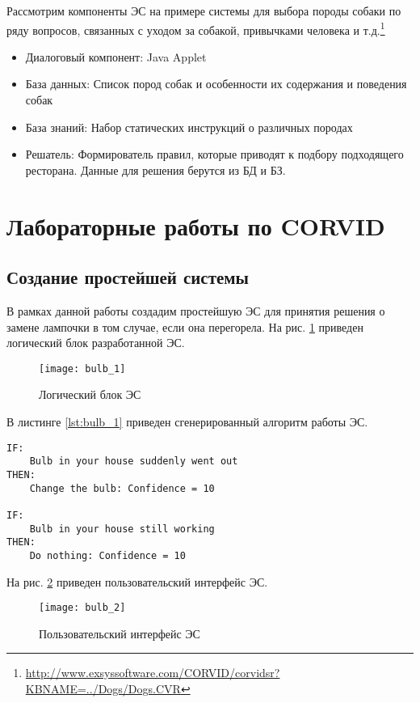 Рассмотрим компоненты ЭС на примере системы для выбора породы собаки по ряду вопросов, связанных с уходом за собакой, привычками человека и т.д.\footnote{\url{http://www.exsyssoftware.com/CORVID/corvidsr?KBNAME=../Dogs/Dogs.CVR}}
\begin{itemize}
	\item Диалоговый компонент: Java Applet
	\item База данных: Список пород собак и особенности их содержания и поведения собак
	\item База знаний: Набор статических инструкций о различных породах
	\item Решатель: Формирователь правил, которые приводят к подбору подходящего ресторана. Данные для решения берутся из БД и БЗ.
\end{itemize}

\section{Лабораторные работы по CORVID}

\subsection{Создание простейшей системы}

В рамках данной работы создадим простейшую ЭС для принятия решения о замене лампочки в том случае, если она перегорела. На рис. \ref{fig:bulb_1} приведен логический блок разработанной ЭС.

\begin{figure}[H]
	\centering
	\texttt{[image: bulb\_1]}
	\caption{Логический блок ЭС}
	\label{fig:bulb_1}
\end{figure}

В листинге \ref{lst:bulb_1} приведен сгенерированный алгоритм работы ЭС.

\begin{lstlisting}[label=lst:bulb_1, caption={Алгоритм работы ЭС}]
IF:
	Bulb in your house suddenly went out
THEN:
	Change the bulb: Confidence = 10

IF:
	Bulb in your house still working
THEN:
	Do nothing: Confidence = 10
\end{lstlisting}

На рис. \ref{fig:bulb_2} приведен пользовательский интерфейс ЭС.

\begin{figure}[H]
	\centering
	\texttt{[image: bulb\_2]}
	\caption{Пользовательский интерфейс ЭС}
	\label{fig:bulb_2}
\end{figure}

